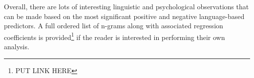 \documentclass[letterpaper]{article}
\begin{document}
Overall, there are lots of interesting linguistic and psychological observations that can be made based on the most significant positive and negative language-based predictors. A full ordered list of n-grams along with associated regression coefficients is provided\footnote{PUT LINK HERE} if the reader is interested in performing their own analysis.
\begin{figure}[t]
\centering
{}
\hspace{0mm}
\end{figure}
\end{document}

